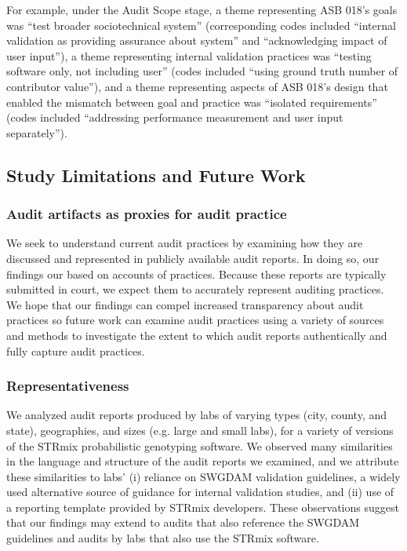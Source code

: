 For example, under the Audit Scope stage, a theme representing ASB 018's goals was ``test broader sociotechnical system'' (corresponding codes included ``internal validation as providing assurance about system'' and ``acknowledging impact of user input''), a theme representing internal validation practices was ``testing software only, not including user'' (codes included ``using ground truth number of contributor value''), and a theme representing aspects of ASB 018's design that enabled the mismatch between goal and practice was ``isolated requirements'' (codes included ``addressing performance measurement and user input separately''). 


 
\subsection{Study Limitations and Future Work}
\label{sec:methods-limits-fw}
\subsubsection{Audit artifacts as proxies for audit practice}
We seek to understand current audit practices by examining how they are discussed and represented in publicly available audit reports. In doing so, our findings our based on accounts of practices. Because these reports are typically submitted in court, we expect them to accurately represent auditing practices. We hope that our findings can compel increased transparency about audit practices so future work can examine audit practices using a variety of sources and methods to investigate the extent to which audit reports authentically and fully capture audit practices.

\subsubsection{Representativeness}
We analyzed audit reports produced by labs of varying types (city, county, and state), geographies, and sizes (e.g. large and small labs), for a variety of versions of the STRmix probabilistic genotyping software. We observed many similarities in the language and structure of the audit reports we examined, and we attribute these similarities to labs' (i) reliance on SWGDAM validation guidelines, a widely used alternative source of guidance for internal validation studies, and (ii) use of a reporting template provided by STRmix developers. These observations suggest that our findings may extend to audits that also reference the SWGDAM guidelines and audits by labs that also use the STRmix software.


